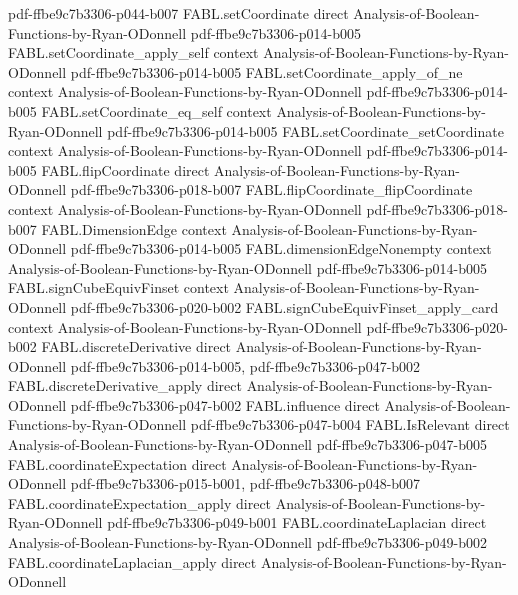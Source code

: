 \begin{theorem}
  {pdf-ffbe9c7b3306-p044-b007}
\proofstep
  {FABL.setCoordinate}
  {direct}
  {Analysis-of-Boolean-Functions-by-Ryan-ODonnell}
  {pdf-ffbe9c7b3306-p014-b005}
\proofstep
  {FABL.setCoordinate_apply_self}
  {context}
  {Analysis-of-Boolean-Functions-by-Ryan-ODonnell}
  {pdf-ffbe9c7b3306-p014-b005}
\proofstep
  {FABL.setCoordinate_apply_of_ne}
  {context}
  {Analysis-of-Boolean-Functions-by-Ryan-ODonnell}
  {pdf-ffbe9c7b3306-p014-b005}
\proofstep
  {FABL.setCoordinate_eq_self}
  {context}
  {Analysis-of-Boolean-Functions-by-Ryan-ODonnell}
  {pdf-ffbe9c7b3306-p014-b005}
\proofstep
  {FABL.setCoordinate_setCoordinate}
  {context}
  {Analysis-of-Boolean-Functions-by-Ryan-ODonnell}
  {pdf-ffbe9c7b3306-p014-b005}
\proofstep
  {FABL.flipCoordinate}
  {direct}
  {Analysis-of-Boolean-Functions-by-Ryan-ODonnell}
  {pdf-ffbe9c7b3306-p018-b007}
\proofstep
  {FABL.flipCoordinate_flipCoordinate}
  {context}
  {Analysis-of-Boolean-Functions-by-Ryan-ODonnell}
  {pdf-ffbe9c7b3306-p018-b007}
\proofstep
  {FABL.DimensionEdge}
  {context}
  {Analysis-of-Boolean-Functions-by-Ryan-ODonnell}
  {pdf-ffbe9c7b3306-p014-b005}
\proofstep
  {FABL.dimensionEdgeNonempty}
  {context}
  {Analysis-of-Boolean-Functions-by-Ryan-ODonnell}
  {pdf-ffbe9c7b3306-p014-b005}
\proofstep
  {FABL.signCubeEquivFinset}
  {context}
  {Analysis-of-Boolean-Functions-by-Ryan-ODonnell}
  {pdf-ffbe9c7b3306-p020-b002}
\proofstep
  {FABL.signCubeEquivFinset_apply_card}
  {context}
  {Analysis-of-Boolean-Functions-by-Ryan-ODonnell}
  {pdf-ffbe9c7b3306-p020-b002}
\proofstep
  {FABL.discreteDerivative}
  {direct}
  {Analysis-of-Boolean-Functions-by-Ryan-ODonnell}
  {pdf-ffbe9c7b3306-p014-b005,
    pdf-ffbe9c7b3306-p047-b002}
\proofstep
  {FABL.discreteDerivative_apply}
  {direct}
  {Analysis-of-Boolean-Functions-by-Ryan-ODonnell}
  {pdf-ffbe9c7b3306-p047-b002}
\proofstep
  {FABL.influence}
  {direct}
  {Analysis-of-Boolean-Functions-by-Ryan-ODonnell}
  {pdf-ffbe9c7b3306-p047-b004}
\proofstep
  {FABL.IsRelevant}
  {direct}
  {Analysis-of-Boolean-Functions-by-Ryan-ODonnell}
  {pdf-ffbe9c7b3306-p047-b005}
\proofstep
  {FABL.coordinateExpectation}
  {direct}
  {Analysis-of-Boolean-Functions-by-Ryan-ODonnell}
  {pdf-ffbe9c7b3306-p015-b001,
    pdf-ffbe9c7b3306-p048-b007}
\proofstep
  {FABL.coordinateExpectation_apply}
  {direct}
  {Analysis-of-Boolean-Functions-by-Ryan-ODonnell}
  {pdf-ffbe9c7b3306-p049-b001}
\proofstep
  {FABL.coordinateLaplacian}
  {direct}
  {Analysis-of-Boolean-Functions-by-Ryan-ODonnell}
  {pdf-ffbe9c7b3306-p049-b002}
\proofstep
  {FABL.coordinateLaplacian_apply}
  {direct}
  {Analysis-of-Boolean-Functions-by-Ryan-ODonnell}

\end{theorem}
